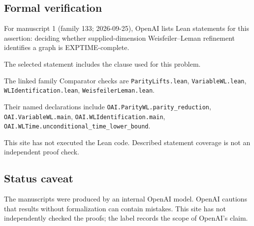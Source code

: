 \documentclass[11pt]{article}
\begin{document}
\subsection{Formal verification}
For manuscript 1 (family 133; 2026-09-25), OpenAI lists Lean statements for this assertion: deciding whether supplied-dimension Weisfeiler--Leman refinement identifies a graph is EXPTIME-complete.

The selected statement includes the clause used for this problem.

The linked family Comparator checks are \texttt{ParityLifts.lean}, \texttt{VariableWL.lean}, \texttt{WLIdentification.lean}, \texttt{WeisfeilerLeman.lean}.

Their named declarations include \texttt{OAI.ParityWL.parity\_reduction}, \texttt{OAI.VariableWL.main}, \texttt{OAI.WLIdentification.main}, \texttt{OAI.WLTime.unconditional\_time\_lower\_bound}.

This site has not executed the Lean code. Described statement coverage is not an independent proof check.

\subsection{Status caveat}
The manuscripts were produced by an internal OpenAI model. OpenAI cautions that results without formalization can contain mistakes. This site has not independently checked the proofs; the label records the scope of OpenAI's claim.
\end{document}
